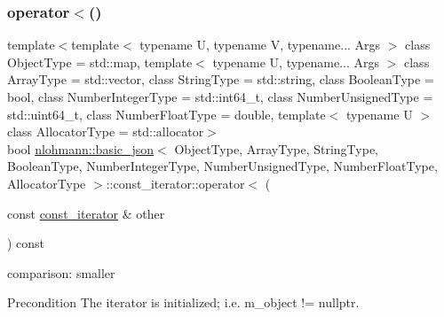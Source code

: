 \subsubsection{\texorpdfstring{operator$<$()}{operator<()}}
{\footnotesize\ttfamily template$<$template$<$ typename U, typename V, typename... Args $>$ class Object\+Type = std\+::map, template$<$ typename U, typename... Args $>$ class Array\+Type = std\+::vector, class String\+Type  = std\+::string, class Boolean\+Type  = bool, class Number\+Integer\+Type  = std\+::int64\+\_\+t, class Number\+Unsigned\+Type  = std\+::uint64\+\_\+t, class Number\+Float\+Type  = double, template$<$ typename U $>$ class Allocator\+Type = std\+::allocator$>$ \\
bool \hyperlink{classnlohmann_1_1basic__json}{nlohmann\+::basic\+\_\+json}$<$ Object\+Type, Array\+Type, String\+Type, Boolean\+Type, Number\+Integer\+Type, Number\+Unsigned\+Type, Number\+Float\+Type, Allocator\+Type $>$\+::const\+\_\+iterator\+::operator$<$ (\begin{DoxyParamCaption}\item[{const \hyperlink{classnlohmann_1_1basic__json_1_1const__iterator}{const\+\_\+iterator} \&}]{other }\end{DoxyParamCaption}) const\hspace{0.3cm}{\ttfamily [inline]}}



comparison\+: smaller 

\begin{DoxyPrecond}{Precondition}
The iterator is initialized; i.\+e. {\ttfamily m\+\_\+object != nullptr}. 
\end{DoxyPrecond}
\mbox{\label{classnlohmann_1_1basic__json_1_1const__iterator_ab31ede5b25ad5e8a3bb06f6eadb50923}} 
